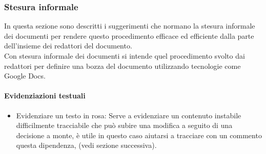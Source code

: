         \subsubsection{Stesura informale}
            In questa sezione sono descritti i suggerimenti che normano la stesura informale dei documenti per rendere questo procedimento efficace ed efficiente dalla parte dell’insieme dei redattori del documento.\\
            Con stesura informale dei documenti si intende quel procedimento svolto dai redattori per definire una bozza del documento utilizzando tecnologie come Google Docs.
            \paragraph{Evidenziazioni testuali}
                \begin{itemize}
                    \item\colorbox{bubblegum}{Evidenziare un testo in rosa}: Serve a evidenziare un contenuto instabile difficilmente tracciabile che può subire una modifica a seguito di una decisione a monte, è utile in questo caso aiutarsi a tracciare con un commento questa dipendenza, (vedi sezione successiva).\\
                \end{itemize}
